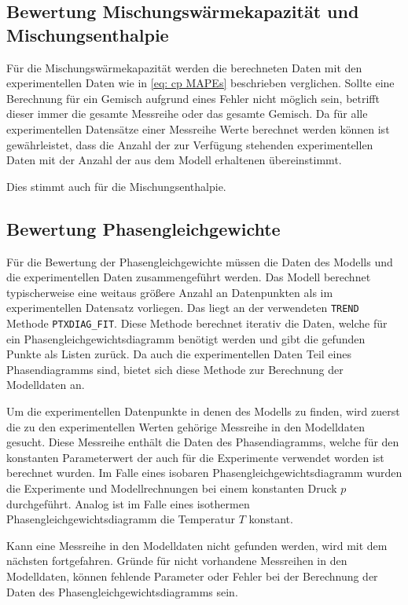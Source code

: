 \documentclass[../thesis.tex]{subfiles}
\begin{document}
\subsection{Bewertung Mischungswärmekapazität und Mischungsenthalpie}

Für die Mischungswärmekapazität werden die berechneten Daten mit den experimentellen Daten wie in \autoref{eq: cp MAPEs} beschrieben verglichen. Sollte eine Berechnung für ein Gemisch aufgrund eines Fehler nicht möglich sein, betrifft dieser immer die gesamte Messreihe oder das gesamte Gemisch. Da für alle experimentellen Datensätze einer Messreihe Werte berechnet werden können ist gewährleistet, dass die Anzahl der zur Verfügung stehenden experimentellen Daten mit der Anzahl der aus dem Modell erhaltenen übereinstimmt.

Dies stimmt auch für die Mischungsenthalpie.

\subsection{Bewertung Phasengleichgewichte}

Für die Bewertung der Phasengleichgewichte müssen die Daten des Modells und die experimentellen Daten zusammengeführt werden. Das Modell berechnet typischerweise eine weitaus größere Anzahl an Datenpunkten als im experimentellen Datensatz vorliegen. Das liegt an der verwendeten \texttt{TREND} Methode \texttt{PTXDIAG\_FIT}. Diese Methode berechnet iterativ die Daten, welche für ein Phasengleichgewichtsdiagramm benötigt werden und gibt die gefunden Punkte als Listen zurück. Da auch die experimentellen Daten Teil eines Phasendiagramms sind, bietet sich diese Methode zur Berechnung der Modelldaten an.

Um die experimentellen Datenpunkte in denen des Modells zu finden, wird zuerst die zu den experimentellen Werten gehörige Messreihe in den Modelldaten gesucht. Diese Messreihe enthält die Daten des Phasendiagramms, welche für den konstanten Parameterwert der auch für die Experimente verwendet worden ist berechnet wurden.  Im Falle eines isobaren Phasengleichgewichtsdiagramm wurden die Experimente und Modellrechnungen bei einem konstanten Druck $ p $ durchgeführt. Analog ist im Falle eines isothermen Phasengleichgewichtsdiagramm die Temperatur $ T $ konstant.

Kann eine Messreihe in den Modelldaten nicht gefunden werden, wird mit dem nächsten fortgefahren. Gründe für nicht vorhandene Messreihen in den Modelldaten, können fehlende Parameter oder Fehler bei der Berechnung der Daten des Phasengleichgewichtsdiagramms sein.
\\
\end{document}
